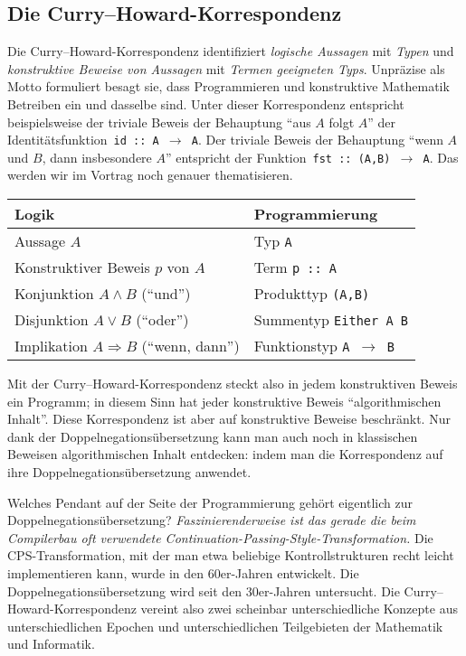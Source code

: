 \documentclass[a4paper,ngerman,10pt]{scrartcl}
\theoremstyle{plain}
\begin{document}
\subsection*{Die Curry--Howard-Korrespondenz}

Die Curry--Howard-Korrespondenz identifiziert \emph{logische Aussagen} mit
\emph{Typen} und \emph{konstruktive Beweise von Aussagen} mit \emph{Termen geeigneten Typs}.
Unpräzise als Motto formuliert besagt sie, dass Programmieren und konstruktive
Mathematik Betreiben ein und dasselbe sind. Unter dieser Korrespondenz
entspricht beispielsweise der triviale Beweis der Behauptung "`aus $A$ folgt
$A$"' der Identitätsfunktion~\texttt{id :: A $\to$ A}. Der triviale Beweis der
Behauptung "`wenn $A$ und $B$, dann insbesondere $A$"' entspricht der
Funktion~\texttt{fst :: (A,B) $\to$ A}. Das werden wir im Vortrag noch genauer
thematisieren.

\begin{center}\begin{tabular}{ll}
  \toprule
  Logik & Programmierung \\\midrule
  Aussage $A$ & Typ \texttt{A} \\
  Konstruktiver Beweis $p$ von $A$ & Term \texttt{p :: A} \\
  Konjunktion $A \wedge B$ ("`und"') & Produkttyp \texttt{(A,B)} \\
  Disjunktion $A \vee B$ ("`oder"') & Summentyp \texttt{Either A B} \\
  Implikation $A \Rightarrow B$ ("`wenn, dann"') & Funktionstyp \texttt{A $\to$ B} \\
  \bottomrule
\end{tabular}\end{center}

Mit der Curry--Howard-Korrespondenz steckt also in jedem konstruktiven Beweis
ein Programm; in diesem Sinn hat jeder konstruktive Beweis "`algorithmischen
Inhalt"'. Diese Korrespondenz ist aber auf konstruktive Beweise beschränkt. Nur
dank der Doppelnegationsübersetzung kann man auch noch in klassischen Beweisen
algorithmischen Inhalt entdecken: indem man die Korrespondenz auf ihre
Doppelnegationsübersetzung anwendet.

Welches Pendant auf der Seite der Programmierung gehört eigentlich zur
Dop\-pel\-ne\-ga\-tions\-über\-set\-zung? \emph{Faszinierenderweise ist das gerade die beim
Compilerbau oft verwendete Continuation-Passing-Style-Transformation.} Die
CPS-Transformation, mit der man etwa beliebige Kontrollstrukturen recht leicht
implementieren kann, wurde in den 60er-Jahren entwickelt. Die
Doppelnegationsübersetzung wird seit den 30er-Jahren untersucht. Die
Curry--Howard-Korrespondenz vereint also zwei scheinbar unterschiedliche
Konzepte aus unterschiedlichen Epochen und unterschiedlichen Teilgebieten der
Mathematik und Informatik.
\end{document}
